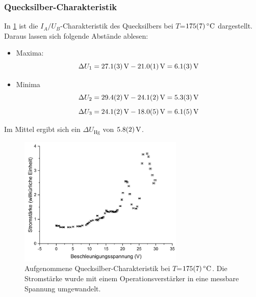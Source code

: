 \documentclass[
	a4paper,
	12pt,
	pagesize,
	ngerman
]{scrartcl}
\begin{document}
	\subsubsection{Quecksilber-Charakteristik}
	In \cref{Hg175} ist die $I_A/U_B$-Charakteristik des Quecksilbers bei $T$=$\SI{175 +- 7}{\degreeCelsius}$ dargestellt. Daraus lassen sich folgende Abstände ablesen:
	\begin{itemize}
		\item Maxima:
		\begin{equation*}
			\Delta{U}_1 = \SI{27,1 +- 0,3}{V} -\SI{21 +- 0,1}{V} = \SI{6,1 +- 0,3}{V}
		\end{equation*}
		\item Minima
		\begin{equation*}\Delta{U}_2 = \SI{29,4 +- 0,2}{V} -\SI{24,1 +- 0,2}{V} = \SI{5,3 +- 0,3}{V}\end{equation*}
		\begin{equation*}\Delta{U}_3 = \SI{24,1 +- 0,2}{V}- \SI{18,0 +- 0,5}{V} = \SI{6,1 +- 0,5}{V}\end{equation*}
	\end{itemize}
	Im Mittel ergibt sich ein $\Delta{U_\text{Hg}}$ von $\SI{5,8 +- 0,2}{V}$.
	
	\begin{figure}[H]
		\includegraphics[width=0.7\textwidth]{Hg175}
		\centering
		\caption{Aufgenommene Quecksilber-Charakteristik bei $T$=$\SI{175 +- 7}{\degreeCelsius}$. Die Stromstärke wurde mit einem Operationsverstärker in eine messbare Spannung umgewandelt.}
		\label{Hg175}
		\centering
	\end{figure}
\end{document}
